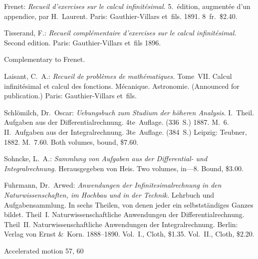 \documentclass[12pt]{book}[2005/09/16]
\newlength{\ParIndent}
\newenvironment{Book}{\medskip\par\noindent\hangindent\ParIndent\ignorespaces}{\par}
\newenvironment{Descrip}{%
  \begin{list}{}{%
      \setlength{\leftmargin}{1.5\ParIndent}%
      \setlength{\itemindent}{\ParIndent}%
      \setlength{\listparindent}{\ParIndent}%
      \setlength{\topsep}{4pt}%
      \item\small\ignorespaces%
  }%
}{%
\end{list}}
\newcommand{\Pagelabel}[1]{\phantomsection\label{page:#1}}
\newcommand{\PageSep}[1]{\Pagelabel{#1}\ignorespaces}
\renewcommand{\(}{{\upshape(}}
\renewcommand{\)}{{\upshape)}}
\newcommand{\Title}[1]{\textit{#1}}
\begin{document}
\begin{Book}
Frenet: \Title{Recueil d'exercises sur le calcul infinitésimal.} 5.~édition,
augmentée d'un appendice, par H.~Laurent. Paris:
Gauthier-Villars et~fils. 1891. 8~fr.\ \$2.40.
\end{Book}
\PageSep{142}

\begin{Book}
Tisserand, F.: \Title{Recueil complémentaire d'exercises sur le calcul
infinitésimal.} Second edition. Paris: Gauthier-Villars et~fils
1896.

\begin{Descrip}
Complementary to Frenet.
\end{Descrip}
\end{Book}

\begin{Book}
Laisant, C.~A.: \Title{Recueil de problèmes de mathématiques.} Tome~VII\@.
Calcul infinitésimal et calcul des fonctions. Mécanique.
Astronomie. (Announced for publication.) Paris: Gauthier-Villars
et~fils.
\end{Book}

\begin{Book}
Schlömilch, Dr.\ Oscar: \Title{Uebungsbuch zum Studium der höheren
Analysis.} I.~Theil. Aufgaben aus der Differentialrechnung.
4te~Auflage. (336~S.) 1887. M.~6. II.~Aufgaben aus der
Integralrechnung. 3te~Auflage. (384~S.) Leipzig: Teubner,
1882. M.~7.60. Both volumes, bound, \$7.60.
\end{Book}

\begin{Book}
Sohncke, L.~A.: \Title{Sammlung von Aufgaben aus der Differential-
und Integralrechnung.} Herausgegeben von Heis. Two volumes,
in---8. Bound, \$3.00.
\end{Book}

\begin{Book}
Fuhrmann, Dr.\ Arwed: \Title{Anwendungen der Infinitesimalrechnung
in den Naturwissenschaften, im Hochbau und in der
Technik.} Lehrbuch und Aufgabensammlung. In sechs Theilen,
von denen jeder ein selbstständiges Ganzes bildet. Theil~I.
Naturwissenschaftliche Anwendungen der Differentialrechnung.
Theil~II. Naturwissenschaftliche Anwendungen der
Integralrechnung. Berlin: Verlag von Ernst \&~Korn. 1888--1890.
Vol.~I., Cloth, \$1.35. Vol.~II., Cloth, \$2.20.
\end{Book}
\PageSep{143}


\printindex

\iffalse

Accelerated motion 57, 60
\end{document}
